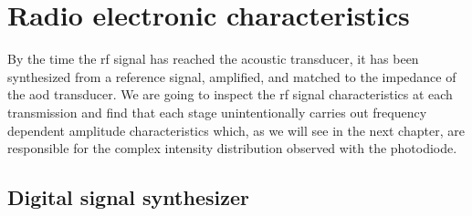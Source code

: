 \chapter{Radio electronic characteristics}

By the time the \gls{rf} signal has reached the acoustic transducer, it has
been synthesized from a reference signal, amplified, and matched to the
impedance of the \gls{aod} transducer. We are going to inspect the \gls{rf}
signal characteristics at each transmission and find that each stage
unintentionally carries out frequency dependent amplitude characteristics
which, as we will see in the next chapter, are responsible for the complex
intensity distribution observed with the photodiode.

\section{Digital signal synthesizer}

